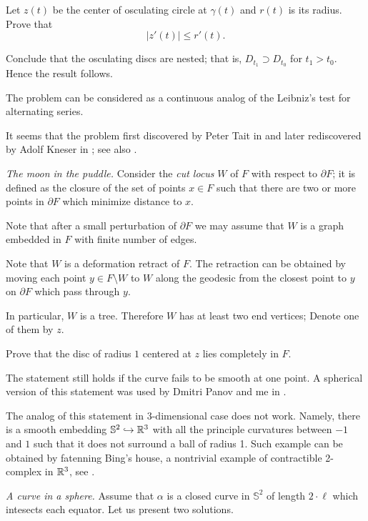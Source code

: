 Let $z(t)$ be the center of osculating circle at $\gamma(t)$
and $r(t)$ is its radius.
Prove that 
$$|z'(t)|\le r'(t).$$

Conclude that the osculating discs are nested;
that is, $D_{t_1}\supset D_{t_0}$ for $t_1>t_0$.
Hence the result follows.

The problem can be considered as a continuous analog of the Leibniz's test for alternating series.

It seems that the problem first discovered by Peter Tait in \cite{tait}
and later rediscovered by Adolf Kneser in \cite{kneser};
see also \cite{ovsienko-tabachnikov}.


\textit{The moon in the puddle.}
Consider the {\it cut locus} $W$
of $F$ with respect to $\partial F$;
it is defined as the closure
of the set of points $x\in F$ 
such that there are two or more points in $\partial F$ which minimize distance to $x$.

Note that after a small perturbation
of $\partial F$ we may assume that
$W$ is a graph embedded in
$F$ with finite number of edges.

Note that $W$ is a
deformation retract of $F$.
The retraction can be obtained by moving each point $y\in F\setminus W$ to $W$
along the geodesic from the closest point to $y$ on $\partial F$ which pass through $y$.

In particular, $W$ is a tree.
Therefore $W$  has
at least two end vertices;
Denote one of them by $z$.

Prove that the disc of radius $1$ centered at $z$ lies completely in $F$.

The statement still holds if the curve fails to be smooth at one point.
A spherical version of this statement 
was used by Dmitri Panov and me 
in \cite{panov-petrunin-ramification}.

The analog of this statement in 3-dimensional case does not work.
Namely, there is a smooth embedding $\mathbb{S}^2\hookrightarrow \mathbb{R}^3$ 
with all the principle curvatures between $-1$ and $1$
such that it does not surround a ball of radius 1.
Such example can be obtained by fatenning Bing's house,
a nontrivial example of contractible 2-complex in $\mathbb{R}^3$, 
see \cite{bing}.

\textit{A curve in a sphere.}
Assume that $\alpha$ is a closed curve in $\mathbb{S}^2$ of length $2\cdot\ell$ which intesects each equator.
Let us present two solutions.

